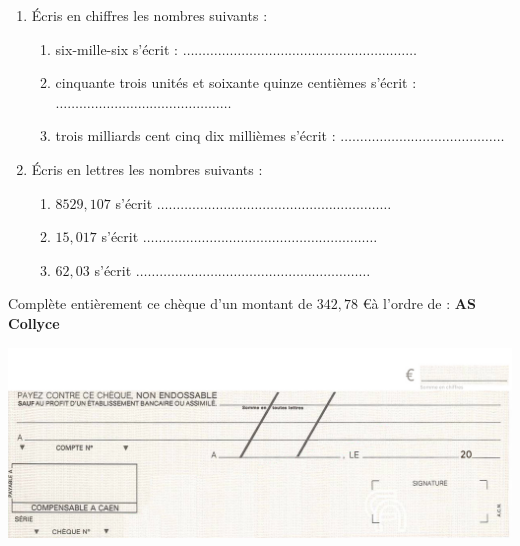 \begin{pageParcourst}

 

\begin{enumerate}
\item  Écris en chiffres les nombres suivants :
\begin{enumerate}
\item six-mille-six  s'écrit  :  $\ldots\ldots\ldots\ldots\ldots\ldots\ldots\ldots\ldots\ldots\ldots\ldots\ldots\ldots\ldots\ldots\ldots\ldots\ldots\ldots$\vspace{0.3cm}
\item cinquante trois unités et soixante quinze centièmes s'écrit :  $\ldots\ldots\ldots\ldots\ldots\ldots\ldots\ldots\ldots\ldots\ldots\ldots\ldots\ldots\ldots$\vspace{0.3cm}
\item trois milliards cent cinq dix millièmes s'écrit :  $\ldots\ldots\ldots\ldots\ldots\ldots\ldots\ldots\ldots\ldots\ldots\ldots\ldots\ldots$\vspace{0.3cm}
\end{enumerate}
\item  Écris en lettres les nombres suivants :
\begin{enumerate}
\item $8 529, 107$ s'écrit $\ldots\ldots\ldots\ldots\ldots\ldots\ldots\ldots\ldots\ldots\ldots\ldots\ldots\ldots\ldots\ldots\ldots\ldots\ldots\ldots$\vspace{0.3cm}
 \item $15,017$ s'écrit $\ldots\ldots\ldots\ldots\ldots\ldots\ldots\ldots\ldots\ldots\ldots\ldots\ldots\ldots\ldots\ldots\ldots\ldots\ldots\ldots$ \vspace{0.3cm}
 \item $62,03$  s'écrit $\ldots\ldots\ldots\ldots\ldots\ldots\ldots\ldots\ldots\ldots\ldots\ldots\ldots\ldots\ldots\ldots\ldots\ldots\ldots\ldots$
\end{enumerate}
\end{enumerate}




Complète entièrement ce chèque d'un montant de $342,78$ \euro à l'ordre de : \textbf{AS Collyce}

 \includegraphics[scale=1]{FIG/spechequedebanque.jpg} 
 


\end{pageParcourst}
